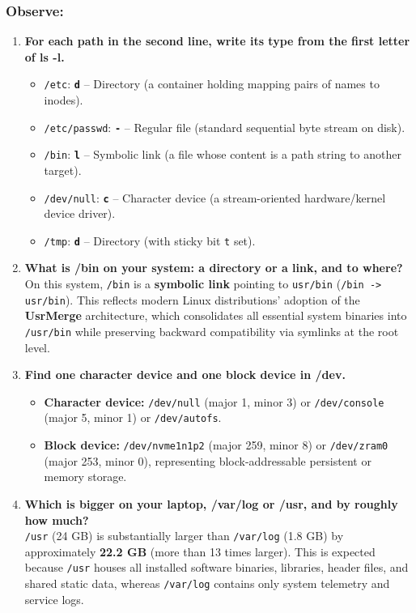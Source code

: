 \documentclass{labreport}
\begin{document}
\subsubsection*{Observe:}
\begin{enumerate}[leftmargin=*]
    \item \textbf{For each path in the second line, write its type from the first letter of ls -l.}
    \begin{itemize}[noitemsep, topsep=2pt]
        \item \texttt{/etc}: \textbf{\texttt{d}} -- Directory (a container holding mapping pairs of names to inodes).
        \item \texttt{/etc/passwd}: \textbf{\texttt{-}} -- Regular file (standard sequential byte stream on disk).
        \item \texttt{/bin}: \textbf{\texttt{l}} -- Symbolic link (a file whose content is a path string to another target).
        \item \texttt{/dev/null}: \textbf{\texttt{c}} -- Character device (a stream-oriented hardware/kernel device driver).
        \item \texttt{/tmp}: \textbf{\texttt{d}} -- Directory (with sticky bit \texttt{t} set).
    \end{itemize}

    \item \textbf{What is /bin on your system: a directory or a link, and to where?}\\[0.2em]
    On this system, \texttt{/bin} is a \textbf{symbolic link} pointing to \texttt{usr/bin} (\texttt{/bin -> usr/bin}). This reflects modern Linux distributions' adoption of the \textbf{UsrMerge} architecture, which consolidates all essential system binaries into \texttt{/usr/bin} while preserving backward compatibility via symlinks at the root level.

    \item \textbf{Find one character device and one block device in /dev.}
    \begin{itemize}[noitemsep, topsep=2pt]
        \item \textbf{Character device:} \texttt{/dev/null} (major 1, minor 3) or \texttt{/dev/console} (major 5, minor 1) or \texttt{/dev/autofs}.
        \item \textbf{Block device:} \texttt{/dev/nvme1n1p2} (major 259, minor 8) or \texttt{/dev/zram0} (major 253, minor 0), representing block-addressable persistent or memory storage.
    \end{itemize}

    \item \textbf{Which is bigger on your laptop, /var/log or /usr, and by roughly how much?}\\[0.2em]
    \texttt{/usr} (24 GB) is substantially larger than \texttt{/var/log} (1.8 GB) by approximately \textbf{22.2 GB} (more than 13 times larger). This is expected because \texttt{/usr} houses all installed software binaries, libraries, header files, and shared static data, whereas \texttt{/var/log} contains only system telemetry and service logs.
\end{enumerate}
\end{document}

